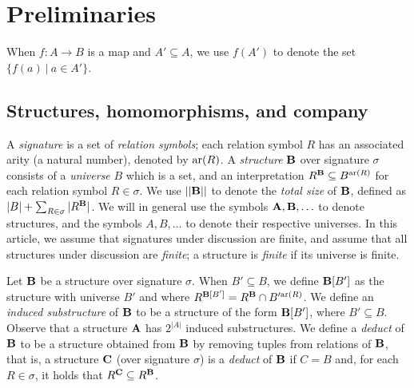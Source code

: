 \documentclass[11pt]{article}
\begin{document}
\newpage

\section{Preliminaries}

When $f: A \to B$ is a map and $A' \subseteq A$,
we use $f(A')$ to denote the
set $\{ f(a) ~|~ a \in A' \}$.

\subsection{Structures, homomorphisms, and company}

A \emph{signature} is a set of \emph{relation symbols};
each relation symbol $R$ has an associated arity (a natural number),
denoted by $\mathrm{ar}(R)$.
A \emph{structure} $\mathbf{B}$ over signature $\sigma$
consists of a \emph{universe} $B$ which is a set,
and an interpretation $R^{\mathbf{B}} \subseteq B^{\mathrm{ar}(R)}$
for each relation symbol $R \in \sigma$.
We use $||\mathbf{B}||$ to denote the \emph{total size}
of $\mathbf{B}$, defined as
$|B| + \sum_{R \in \sigma} |R^{\mathbf{B}}|$.
We will in general use the symbols $\mathbf{A}, \mathbf{B}, \ldots$ to denote
structures, and the symbols $A, B, \ldots$ to denote their respective
universes.
In this article, we 
assume that signatures under discussion are finite, and 
assume that all structures under discussion are \emph{finite}; 
a structure is \emph{finite}
if its universe is finite.

Let $\mathbf{B}$ be a structure over signature $\sigma$.
When $B' \subseteq B$, we define
$\mathbf{B}[B']$ as the structure
with universe $B'$
and where $R^{\mathbf{B}[B']} = R^{\mathbf{B}} \cap B'^{\mathrm{ar}(R)}$.
We define an \emph{induced substructure} of $\mathbf{B}$ to 
be a structure of the form $\mathbf{B}[B']$, where $B' \subseteq B$.
Observe that a structure $\mathbf{A}$ has $2^{|A|}$ induced substructures.
We define a \emph{deduct} of $\mathbf{B}$ to be a structure
obtained from $\mathbf{B}$ by removing tuples from relations of $\mathbf{B}$,
that is, a structure $\mathbf{C}$ (over signature $\sigma$)
is a \emph{deduct} of $\mathbf{B}$ 
if $C = B$ and, for each $R \in \sigma$,
it holds that $R^{\mathbf{C}} \subseteq R^{\mathbf{B}}$.
\end{document}
